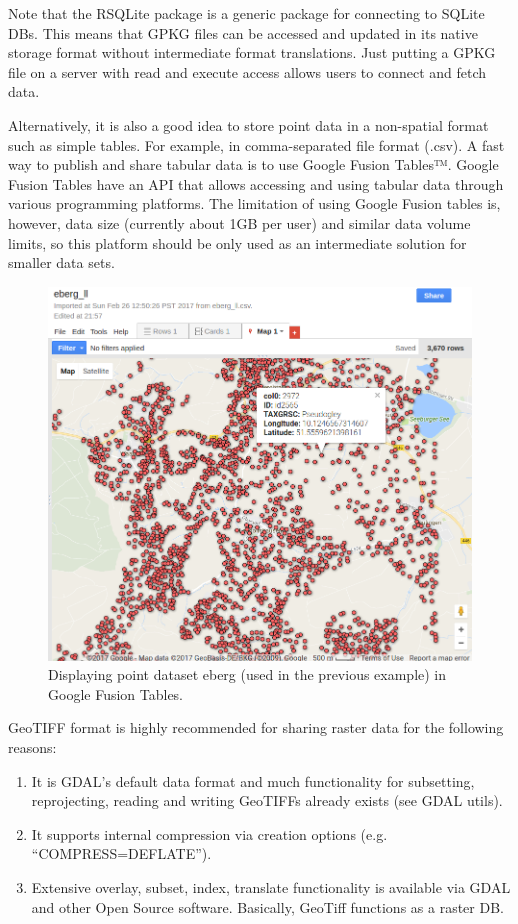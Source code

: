 \documentclass[10pt,b5paper,]{book}
\providecommand{\tightlist}{%
  \setlength{\itemsep}{0pt}\setlength{\parskip}{0pt}}
\theoremstyle{definition}
\theoremstyle{definition}
\theoremstyle{definition}
\theoremstyle{remark}
\begin{document}
Note that the RSQLite package is a generic package for connecting to
SQLite DBs. This means that GPKG files can be accessed and updated in
its native storage format without intermediate format translations. Just
putting a GPKG file on a server with read and execute access allows
users to connect and fetch data.

Alternatively, it is also a good idea to store point data in a
non-spatial format such as simple tables. For example, in
comma-separated file format (.csv). A fast way to publish and share
tabular data is to use Google Fusion Tables™. Google Fusion Tables have
an API that allows accessing and using tabular data through various
programming platforms. The limitation of using Google Fusion tables is,
however, data size (currently about 1GB per user) and similar data
volume limits, so this platform should be only used as an intermediate
solution for smaller data sets.

\begin{figure}
\centering
\includegraphics{images/Data_sharing_eberg.png}
\caption{Displaying point dataset eberg (used in the previous example)
in Google Fusion Tables.}
\end{figure}

GeoTIFF format is highly recommended for sharing raster data for the
following reasons:

\begin{enumerate}
\def\labelenumi{\arabic{enumi}.}
\tightlist
\item
  It is GDAL's default data format and much functionality for
  subsetting, reprojecting, reading and writing GeoTIFFs already exists
  (see GDAL utils).
\item
  It supports internal compression via creation options (e.g.
  ``COMPRESS=DEFLATE'').
\item
  Extensive overlay, subset, index, translate functionality is available
  via GDAL and other Open Source software. Basically, GeoTiff functions
  as a raster DB.
\end{enumerate}
\end{document}
